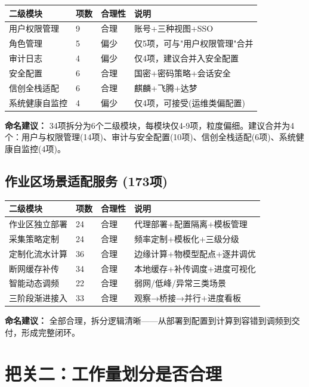 \documentclass[11pt,a4paper]{ctexart}
\begin{document}
\begin{longtable}{p{3.5cm}p{2.5cm}p{2cm}p{4.5cm}}
\toprule\textbf{二级模块} & \textbf{项数} & \textbf{合理性} & \textbf{说明}\\\midrule
用户权限管理 & 9 & \color{ok}合理 & 账号+三种视图+SSO \\
角色管理 & 5 & \color{warn}偏少 & 仅5项，可与"用户权限管理"合并 \\
审计日志 & 4 & \color{warn}偏少 & 仅4项，建议合并入安全配置 \\
安全配置 & 6 & \color{ok}合理 & 国密+密码策略+会话安全 \\
信创全栈适配 & 6 & \color{ok}合理 & 麒麟+飞腾+达梦 \\
系统健康自监控 & 4 & \color{warn}偏少 & 仅4项，可接受(运维类偏配置) \\\bottomrule
\end{longtable}

\textbf{命名建议：} 34项拆分为6个二级模块，每模块仅4-9项，粒度偏细。建议合并为4个：用户与权限管理(14项)、审计与安全配置(10项)、信创全栈适配(6项)、系统健康自监控(4项)。

\subsection{作业区场景适配服务 (173项)}

\begin{longtable}{p{3.5cm}p{2.5cm}p{2cm}p{4.5cm}}
\toprule\textbf{二级模块} & \textbf{项数} & \textbf{合理性} & \textbf{说明}\\\midrule
作业区独立部署 & 24 & \color{ok}合理 & 代理部署+配置隔离+模板管理 \\
采集策略定制 & 24 & \color{ok}合理 & 频率定制+模板化+三级分级 \\
定制化流水计算 & 36 & \color{ok}合理 & 边缘计算+物模型配点+逐井调优 \\
断网缓存补传 & 34 & \color{ok}合理 & 本地缓存+补传调度+进度可视化 \\
智能动态调频 & 22 & \color{ok}合理 & 弱网/低峰/异常三类场景 \\
三阶段渐进接入 & 33 & \color{ok}合理 & 观察→桥接→并行+进度看板 \\\bottomrule
\end{longtable}

\textbf{命名建议：} 全部合理，拆分逻辑清晰——从部署到配置到计算到容错到调频到交付，形成完整闭环。

\section{把关二：工作量划分是否合理}
\end{document}
